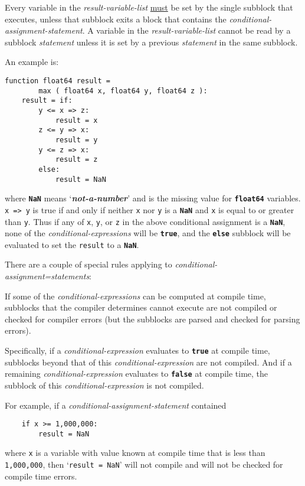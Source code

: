 \documentclass[12pt]{article}
\newcommand{\TT}[1]{{\tt \bfseries #1}}
\newcommand{\key}[1]{{\bf \em #1}\index{#1}}
\newenvironment{indpar}[1][0.3in]%
	{\begin{list}{}%
		     {\setlength{\itemsep}{0in}%
		      \setlength{\topsep}{0in}%
		      \setlength{\parsep}{1ex}%
		      \setlength{\labelwidth}{#1}%
		      \setlength{\leftmargin}{#1}%
		      \addtolength{\leftmargin}{\labelsep}}%
	 \item}%
	{\end{list}}
\begin{document}
Every variable in the {\em result-variable-list} \underline{must} be set by the
single subblock that executes, unless that subblock exits a block
that contains the {\em conditional-assignment-statement}.  A variable in the
{\em result-variable-list} cannot be read by a subblock {\em statement}
unless it is set by a previous {\em statement} in the
same subblock.

An example is:
\begin{indpar}\begin{verbatim}
function float64 result =
        max ( float64 x, float64 y, float64 z ):
    result = if:
        y <= x => z:
            result = x
        z <= y => x:
            result = y
        y <= z => x:
            result = z
        else:
            result = NaN
\end{verbatim}\end{indpar}

where \TT{NaN} means `\key{not-a-number}' and is the missing
value for \TT{float64} variables.  {\tt x~=>~y} is true if
and only if neither {\tt x} nor {\tt y} is a \TT{NaN} and
{\tt x} is equal to or greater than {\tt y}.  Thus if any of
{\tt x}, {\tt y}, or {\tt z} in the above conditional assignment
is a \TT{NaN}, none of the {\em conditional-expressions}
will be \TT{true}, and the \TT{else} subblock will be evaluated to set
the {\tt result} to a \TT{NaN}.

There are a couple of special rules applying to
{\em conditional-assignment=statements}:\label{CONDITIONAL-SPECIAL-RULES}

\begin{indpar}
If some of the {\em conditional-expressions} can be computed at compile
time, subblocks that the compiler determines cannot execute are not
compiled or checked for compiler errors (but the subblocks are parsed
and checked for parsing errors).

Specifically, if a {\em conditional-expression} evaluates to \TT{true}
at compile time, subblocks beyond that of this {\em conditional-expression}
are not compiled.  And if a remaining {\em conditional-expression}
evaluates to \TT{false} at compile time, the subblock of this
{\em conditional-expression} is not compiled.
\end{indpar}

For example, if a {\em conditional-assignment-statement}
contained
\begin{indpar}\begin{verbatim}
    if x >= 1,000,000:
        result = NaN
\end{verbatim}\end{indpar}
where {\tt x} is a variable with value known at compile time
that is less than {\tt 1,000,000}, then
`{\tt result = NaN}' will not compile
and will not be checked for compile time errors.
\end{document}
